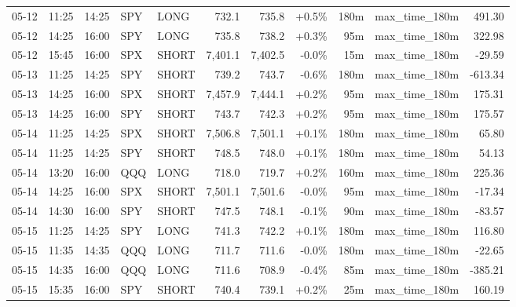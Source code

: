 \documentclass[11pt,a4paper,twoside]{article}
\begin{document}
\begin{center}
\begin{longtable}{>{\color{txtmain}}l l l l l r r r r >{\color{txtmain}}l r}
05-12 & 11:25 & 14:25 & SPY & LONG & 732.1 & 735.8 & \textcolor{wingreen}{+0.5\%} & 180m & max\_time\_180m & \textcolor{wingreen}{491.30} \\
05-12 & 14:25 & 16:00 & SPY & LONG & 735.8 & 738.2 & \textcolor{wingreen}{+0.3\%} & 95m & max\_time\_180m & \textcolor{wingreen}{322.98} \\
05-12 & 15:45 & 16:00 & SPX & SHORT & 7,401.1 & 7,402.5 & \textcolor{lossred}{-0.0\%} & 15m & max\_time\_180m & \textcolor{lossred}{-29.59} \\
05-13 & 11:25 & 14:25 & SPY & SHORT & 739.2 & 743.7 & \textcolor{lossred}{-0.6\%} & 180m & max\_time\_180m & \textcolor{lossred}{-613.34} \\
05-13 & 14:25 & 16:00 & SPX & SHORT & 7,457.9 & 7,444.1 & \textcolor{wingreen}{+0.2\%} & 95m & max\_time\_180m & \textcolor{wingreen}{175.31} \\
05-13 & 14:25 & 16:00 & SPY & SHORT & 743.7 & 742.3 & \textcolor{wingreen}{+0.2\%} & 95m & max\_time\_180m & \textcolor{wingreen}{175.57} \\
05-14 & 11:25 & 14:25 & SPX & SHORT & 7,506.8 & 7,501.1 & \textcolor{wingreen}{+0.1\%} & 180m & max\_time\_180m & \textcolor{wingreen}{65.80} \\
05-14 & 11:25 & 14:25 & SPY & SHORT & 748.5 & 748.0 & \textcolor{wingreen}{+0.1\%} & 180m & max\_time\_180m & \textcolor{wingreen}{54.13} \\
05-14 & 13:20 & 16:00 & QQQ & LONG & 718.0 & 719.7 & \textcolor{wingreen}{+0.2\%} & 160m & max\_time\_180m & \textcolor{wingreen}{225.36} \\
05-14 & 14:25 & 16:00 & SPX & SHORT & 7,501.1 & 7,501.6 & \textcolor{lossred}{-0.0\%} & 95m & max\_time\_180m & \textcolor{lossred}{-17.34} \\
05-14 & 14:30 & 16:00 & SPY & SHORT & 747.5 & 748.1 & \textcolor{lossred}{-0.1\%} & 90m & max\_time\_180m & \textcolor{lossred}{-83.57} \\
05-15 & 11:25 & 14:25 & SPY & LONG & 741.3 & 742.2 & \textcolor{wingreen}{+0.1\%} & 180m & max\_time\_180m & \textcolor{wingreen}{116.80} \\
05-15 & 11:35 & 14:35 & QQQ & LONG & 711.7 & 711.6 & \textcolor{lossred}{-0.0\%} & 180m & max\_time\_180m & \textcolor{lossred}{-22.65} \\
05-15 & 14:35 & 16:00 & QQQ & LONG & 711.6 & 708.9 & \textcolor{lossred}{-0.4\%} & 85m & max\_time\_180m & \textcolor{lossred}{-385.21} \\
05-15 & 15:35 & 16:00 & SPY & SHORT & 740.4 & 739.1 & \textcolor{wingreen}{+0.2\%} & 25m & max\_time\_180m & \textcolor{wingreen}{160.19} \\

\end{longtable}
\end{center}
\end{document}

